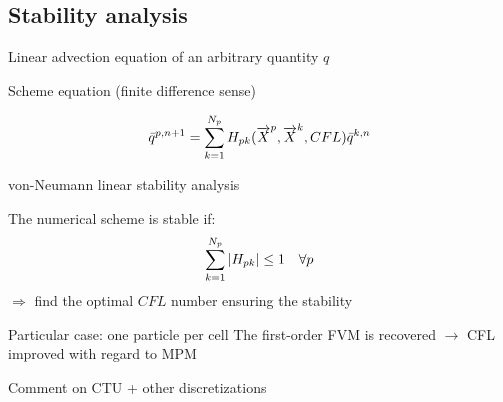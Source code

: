 \subsection{Stability analysis}
\begin{frame}{Linear advection equation of an arbitrary quantity $q$}%
  \begin{block}{Scheme equation (finite difference sense)}
    \begin{footnotesize}
      \begin{equation*}
        \bar{q}^{p,n+1}=\sum_{k=1}^{N_p}H_{pk}({\overrightarrow{X}}^p,{\overrightarrow{X}}^k,CFL)\bar{q}^{k,n}
      \end{equation*}
    \end{footnotesize}
  \end{block}
  \begin{block}{von-Neumann linear stability analysis}
    \begin{footnotesize}
      The numerical scheme is stable if:
      \begin{equation*}
        \sum_{k=1}^{N_p}\left\vert H_{pk}\right\vert \leq 1 \quad \forall p
      \end{equation*}
      \alert{$\Rightarrow$ find the optimal $CFL$ number ensuring the stability}
    \end{footnotesize}
  \end{block}\pause
  \begin{footnotesize}
    \begin{block}{Particular case: one particle per cell}
      The first-order FVM is recovered $\rightarrow$ CFL improved with regard to MPM 
    \end{block}
    Comment on CTU + other discretizations
  \end{footnotesize}
\end{frame}


